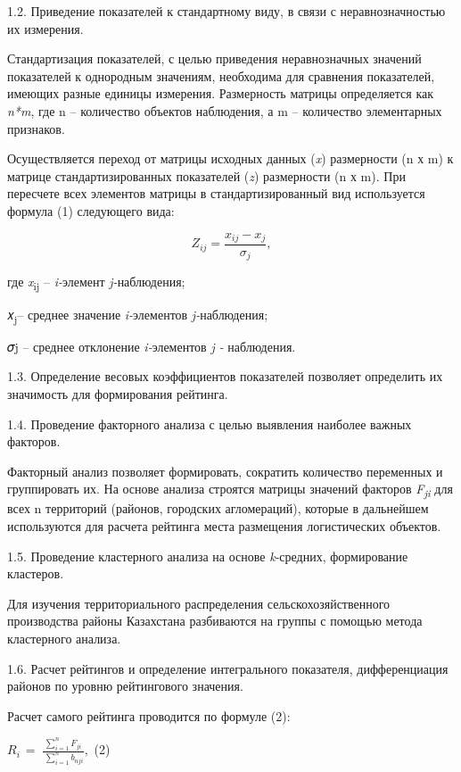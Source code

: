 \begin{multicols}{2}
1.2. Приведение показателей к стандартному виду, в связи с
неравнозначностью их измерения.

Стандартизация показателей, с целью приведения неравнозначных значений
показателей к однородным значениям, необходима для сравнения
показателей, имеющих разные единицы измерения. Размерность матрицы
определяется как \emph{n*m}, где n -- количество объектов наблюдения, а
m -- количество элементарных признаков.

Осуществляется переход от матрицы исходных данных (\emph{x}) размерности
(n х m) к матрице стандартизированных показателей (\emph{z}) размерности
(n х m). При пересчете всех элементов матрицы в стандартизированный вид
используется формула (1) следующего вида:

\begin{equation}
Z_{ij}=\frac{x_{ij}-x_j}{\sigma_j},
\end{equation}

где \emph{x}\textsubscript{ij} -- \emph{i-}элемент \emph{j-}наблюдения;

𝑥\textsubscript{j}-- среднее значение \emph{i-}элементов
\emph{j-}наблюдения;

𝜎j -- среднее отклонение \emph{i-}элементов \emph{j -} наблюдения.

1.3. Определение весовых коэффициентов показателей позволяет определить
их значимость для формирования рейтинга.

1.4. Проведение факторного анализа с целью выявления наиболее важных
факторов.

Факторный анализ позволяет формировать, сократить количество переменных
и группировать их. На основе анализа строятся матрицы значений факторов
\emph{F\textsubscript{ji}} для всех n территорий (районов, городских
агломераций), которые в дальнейшем используются для расчета рейтинга
места размещения логистических объектов.

1.5. Проведение кластерного анализа на основе \emph{k}-средних,
формирование кластеров.

Для изучения территориального распределения сельскохозяйственного
производства районы Казахстана разбиваются на группы с помощью метода
кластерного анализа.

1.6. Расчет рейтингов и определение интегрального показателя,
дифференциация районов по уровню рейтингового значения.

Расчет самого рейтинга проводится по формуле (2):

\(R_{i\ } = \ \frac{\sum_{i = 1}^{n}F_{ji}}{\ \sum_{i = 1}^{n}b_{nji}},\)
(2)


\end{multicols}
